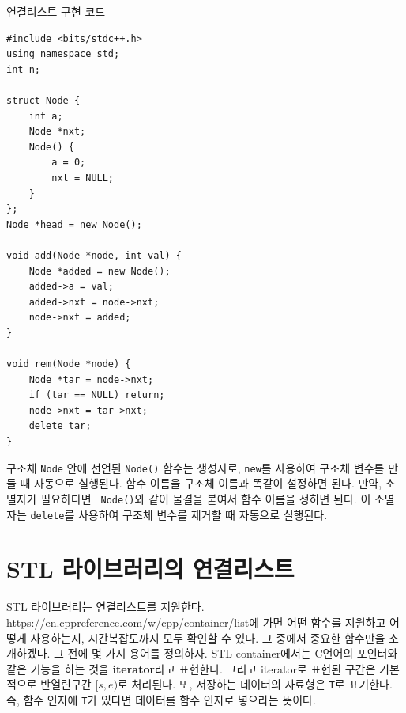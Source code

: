 \begin{code} \label{code: linked-list}
연결리스트 구현 코드
\begin{lstlisting}
#include <bits/stdc++.h>
using namespace std;
int n;
    
struct Node {
    int a;
    Node *nxt;
    Node() {
        a = 0;
        nxt = NULL;
    }
};
Node *head = new Node();
    
void add(Node *node, int val) {
    Node *added = new Node();
    added->a = val;
    added->nxt = node->nxt;
    node->nxt = added;
}
    
void rem(Node *node) {
    Node *tar = node->nxt;
    if (tar == NULL) return;
    node->nxt = tar->nxt;
    delete tar;
}
\end{lstlisting}
\end{code}

구조체 \texttt{Node} 안에 선언된 \texttt{Node()} 함수는 생성자로, \texttt{new}를 사용하여 구조체 변수를 만들 때 자동으로 실행된다. 함수 이름을 구조체 이름과 똑같이 설정하면 된다. 만약, 소멸자가 필요하다면 \texttt{~Node()}와 같이 물결을 붙여서 함수 이름을 정하면 된다. 이 소멸자는 \texttt{delete}를 사용하여 구조체 변수를 제거할 때 자동으로 실행된다.

\section{STL 라이브러리의 연결리스트}
STL 라이브러리는 연결리스트를 지원한다. \url{https://en.cppreference.com/w/cpp/container/list}에 가면 어떤 함수를 지원하고 어떻게 사용하는지, 시간복잡도까지 모두 확인할 수 있다. 그 중에서 중요한 함수만을 소개하겠다. 그 전에 몇 가지 용어를 정의하자. STL container에서는 C언어의 포인터와 같은 기능을 하는 것을 \textbf{iterator}라고 표현한다. 그리고 iterator로 표현된 구간은 기본적으로 반열린구간 $[s, e)$로 처리된다. 또, 저장하는 데이터의 자료형은 \texttt{T}로 표기한다. 즉, 함수 인자에 \texttt{T}가 있다면 데이터를 함수 인자로 넣으라는 뜻이다.

